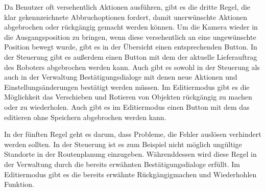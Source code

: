 Da Benutzer oft versehentlich Aktionen ausführen, gibt es die dritte Regel, die klar gekennzeichnete Abbruchoptionen fordert, damit unerwünschte Aktionen abgebrochen oder rückgängig gemacht werden können. Um die Kamera wieder in die Ausgangsposition zu bringen, wenn diese versehentlich an eine ungewünschte Position bewegt wurde, gibt es in der Übersicht einen entsprechenden Button. In der Steuerung gibt es außerdem einen Button mit dem der aktuelle Lieferauftrag des Roboters abgebrochen werden kann. Auch gibt es sowohl in der Steuerung als auch in der Verwaltung Bestätigungsdialoge mit denen neue Aktionen und Einstellungsänderungen bestätigt werden müssen. Im Editiermodus gibt es die Möglichkeit das Verschieben und Rotieren von Objekten rückgängig zu machen oder zu wiederholen. Auch gibt es im Editiermodus einen Button mit dem das editieren ohne Speichern abgebrochen werden kann.



In der fünften Regel geht es darum, dass Probleme, die Fehler auslösen verhindert werden sollten. In der Steuerung ist es zum Beispiel nicht möglich ungültige Standorte in der Routenplanung einzugeben. Währenddessen wird diese Regel in der Verwaltung durch die bereits erwähnten Bestätigungsdialoge erfüllt. Im Editiermodus gibt es die bereits erwähnte Rückgängigmachen und Wiederhohlen Funktion.



